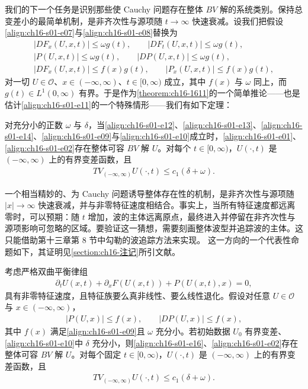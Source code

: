 \documentclass[../../main.tex]{subfiles}
\begin{document}
我们的下一个任务是识别那些使 Cauchy 问题存在整体 $BV$ 解的系统类别。保持总变差小的最简单机制，是非齐次性与源项随 $t\to\infty$ 快速衰减。设我们把假设\eqref{align:ch16-s01-e07}与\eqref{align:ch16-s01-e08}替换为
\begin{align}
|DF_x(U,x,t)|\leqslant\omega g(t),\qquad|DF_t(U,x,t)|\leqslant\omega g(t),
\label{align:ch16-s01-e12}\\
|P(U,x,t)|\leqslant\omega g(t),\qquad|DP(U,x,t)|\leqslant\omega g(t),
\label{align:ch16-s01-e13}\\
|DF_x(U,x,t)|\leqslant f(x)g(t),\qquad|P_x(U,x,t)|\leqslant f(x)g(t),
\label{align:ch16-s01-e14}
\end{align}
对一切 $U\in\mathscr{O}$、$x\in(-\infty,\infty)$、$t\in[0,\infty)$ 成立，其中 $f(x)$ 与 $\omega$ 同上，而 $g(t)\in L^1(0,\infty)$ 有界。于是作为\cref{theorem:ch16-1611}的一个简单推论——也是估计\eqref{align:ch16-s01-e11}的一个特殊情形——我们有如下定理：

\begin{theorem}\label{theorem:ch16-1612}
对充分小的正数 $\omega$ 与 $\delta$，当\eqref{align:ch16-s01-e12}、\eqref{align:ch16-s01-e13}、\eqref{align:ch16-s01-e14}、\eqref{align:ch16-s01-e09}与\eqref{align:ch16-s01-e10}成立时，\eqref{align:ch16-s01-e01}、\eqref{align:ch16-s01-e02}存在整体可容 $BV$ 解 $U$。对每个 $t\in[0,\infty)$，$U(\cdot,t)$ 是 $(-\infty,\infty)$ 上的有界变差函数，且
\begin{align}
TV_{(-\infty,\infty)}U(\cdot,t)\leqslant c_1(\delta+\omega).
\label{align:ch16-s01-e15}
\end{align}
\end{theorem}

一个相当精妙的、为 Cauchy 问题诱导整体存在性的机制，是非齐次性与源项随 $|x|\to\infty$ 快速衰减，并与非零特征速度相结合。事实上，当所有特征速度都远离零时，可以预期：随 $t$ 增加，波的主体远离原点，最终进入并停留在非齐次性与源项影响可忽略的区域。要验证这一猜想，需要刻画整体波型并追踪波的主体。这只能借助第十三章第 8 节中勾勒的波追踪方法来实现。
这一方向的一个代表性命题如下，其证明见\cref{section:ch16-注记}所引文献。

\begin{theorem}\label{theorem:ch16-1613}
考虑严格双曲平衡律组
\begin{align}
\partial_tU(x,t)+\partial_xF(U(x,t))+P(U(x,t),x)=0,
\label{align:ch16-s01-e16}
\end{align}
具有非零特征速度，且特征族要么真非线性、要么线性退化。假设对任意 $U\in\mathscr{O}$ 与 $x\in(-\infty,\infty)$，
\begin{align}
|P(U,x)|\leqslant f(x),\qquad|DP(U,x)|\leqslant f(x),
\label{align:ch16-s01-e17}
\end{align}
其中 $f(x)$ 满足\eqref{align:ch16-s01-e09}且 $\omega$ 充分小。若初始数据 $U_0$ 有界变差、\eqref{align:ch16-s01-e10}中 $\delta$ 充分小，则\eqref{align:ch16-s01-e16}、\eqref{align:ch16-s01-e02}存在整体可容 $BV$ 解 $U$。对每个固定 $t\in[0,\infty)$，$U(\cdot,t)$ 是 $(-\infty,\infty)$ 上的有界变差函数，且
\begin{align}
TV_{(-\infty,\infty)}U(\cdot,t)\leqslant c_1(\delta+\omega).
\label{align:ch16-s01-e18}
\end{align}
\end{theorem}
\end{document}
